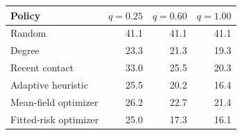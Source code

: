 \begin{tabular}{lrrr}\toprule
Policy & $q=0.25$ & $q=0.60$ & $q=1.00$\\\midrule
Random & 41.1 & 41.1 & 41.1\\
Degree & 23.3 & 21.3 & 19.3\\
Recent contact & 33.0 & 25.5 & 20.3\\
Adaptive heuristic & 25.5 & 20.2 & 16.4\\
Mean-field optimizer & 26.2 & 22.7 & 21.4\\
Fitted-risk optimizer & 25.0 & 17.3 & 16.1\\
\bottomrule\end{tabular}
